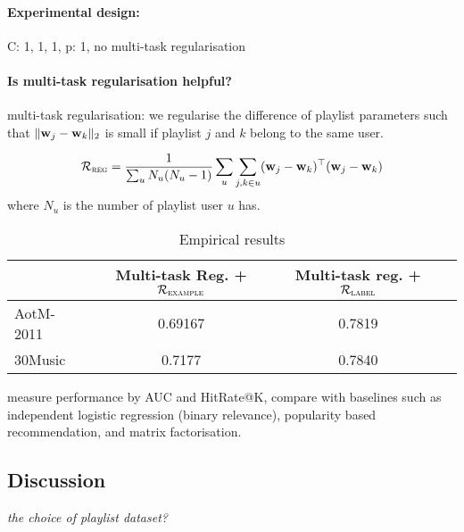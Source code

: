 \paragraph{Experimental design:}
C: 1, 1, 1, p: 1, no multi-task regularisation

\paragraph{Is multi-task regularisation helpful?}

multi-task regularisation: we regularise the difference of playlist parameters 
such that $\|\mathbf{w}_j - \mathbf{w}_k\|_2$ is small if playlist $j$ and $k$ belong to the same user.

\begin{equation*}
\mathcal{R}_\textsc{reg} = \frac{1}{\sum_u N_u (N_u - 1)} \sum_u \sum_{j, k \in u} (\mathbf{w}_j - \mathbf{w}_k)^\top (\mathbf{w}_j - \mathbf{w}_k)
\end{equation*}
where $N_u$ is the number of playlist user $u$ has.

\begin{table}[!h]
\centering
\caption{Empirical results}
\begin{tabular}{l|ccc}
\toprule
{}            & Multi-task Reg. + $\mathcal{R}_\textsc{example}$ & Multi-task reg. + $\mathcal{R}_\textsc{label}$ \\
\midrule
AotM-2011     & 0.69167 & 0.7819 \\
30Music       & 0.7177  & 0.7840 \\
\bottomrule
\end{tabular}
\end{table}



\TODO
measure performance by AUC and HitRate@K,
compare with baselines such as independent logistic regression (\ie binary relevance), popularity based recommendation,
and matrix factorisation.



\subsection{Discussion}

{\it the choice of playlist dataset?}
